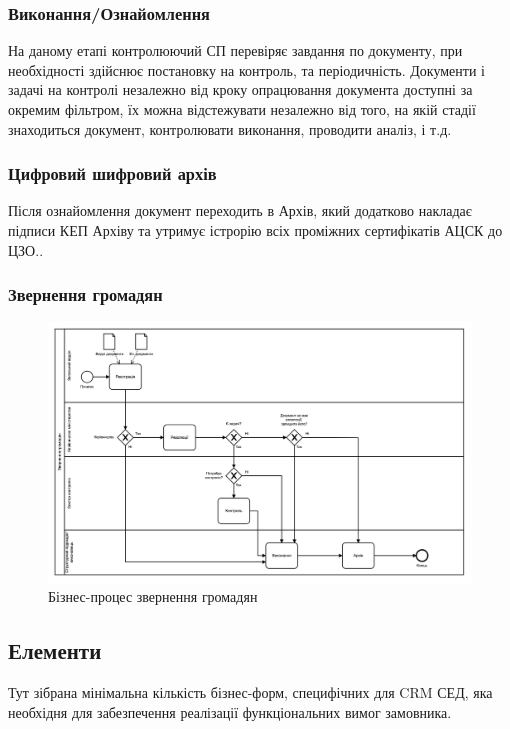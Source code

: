 \subsubsection*{Виконання/Ознайомлення}

На даному етапі контролюючий СП перевіряє завдання по документу,
при необхідності здійснює постановку на контроль, та періодичність.
Документи і задачі на контролі незалежно від кроку опрацювання
документа доступні за окремим фільтром, їх можна відстежувати
незалежно від того, на якій стадії знаходиться документ, контролювати
виконання, проводити аналіз, і т.д.

\subsubsection*{Цифровий шифровий архів}

Після ознайомлення документ переходить в Архів, який додатково накладає
підписи КЕП Архіву та утримує істрорію всіх проміжних сертифікатів АЦСК до ЦЗО..

\subsubsection{Звернення громадян}

\begin{figure}[!htbp]
\centerline{\includegraphics[scale=0.3]{citizenInquire.png}}
\caption{Бізнес-процес звернення громадян}
\end{figure}

\newpage
\subsection{Елементи}

Тут зібрана мінімальна кількість бізнес-форм, специфічних для CRM СЕД,
яка необхідня для забезпечення реалізації функціональних вимог замовника.

